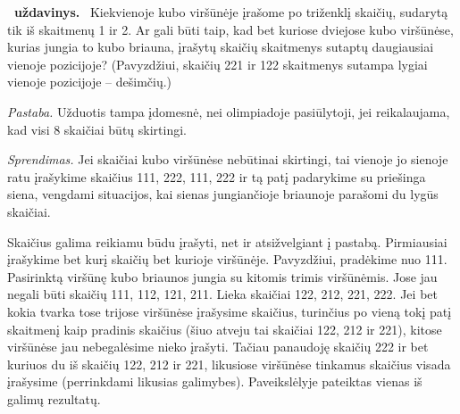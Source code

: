 \documentclass[11pt,a4paper]{article}
\newcounter{uzdavinys}
\newenvironment{uzdavinys}
  {\refstepcounter{uzdavinys}\par\medskip\noindent\textbf{\theuzdavinys\ uždavinys.}\ }
  {\par\medskip}
\begin{document}
\begin{uzdavinys} 
Kiekvienoje kubo viršūnėje įrašome po triženklį skaičių, sudarytą tik iš skaitmenų 1 ir 2. Ar gali būti taip, kad bet kuriose dviejose kubo viršūnėse, kurias jungia to kubo briauna, įrašytų skaičių skaitmenys sutaptų daugiausiai vienoje pozicijoje? (Pavyzdžiui, skaičių 221 ir 122 skaitmenys sutampa lygiai vienoje pozicijoje -- dešimčių.)

\textit{Pastaba.} Užduotis tampa įdomesnė, nei olimpiadoje pasiūlytoji, jei reikalaujama, kad visi 8 skaičiai būtų skirtingi.
\end{uzdavinys}

\textit{Sprendimas.} Jei skaičiai kubo viršūnėse nebūtinai skirtingi, tai vienoje jo sienoje ratu įrašykime skaičius 111, 222, 111, 222 ir tą patį padarykime su priešinga siena, vengdami situacijos, kai sienas jungiančioje briaunoje parašomi du lygūs skaičiai.

Skaičius galima reikiamu būdu įrašyti, net ir atsižvelgiant į pastabą. Pirmiausiai įrašykime bet kurį skaičių bet kurioje viršūnėje. Pavyzdžiui, pradėkime nuo 111. Pasirinktą viršūnę kubo briaunos jungia su kitomis trimis viršūnėmis. Jose jau negali būti skaičių 111, 112, 121, 211. Lieka skaičiai 122, 212, 221, 222. Jei bet kokia tvarka tose trijose viršūnėse įrašysime skaičius, turinčius po vieną tokį patį skaitmenį kaip pradinis skaičius (šiuo atveju tai skaičiai 122, 212 ir 221), kitose viršūnėse jau nebegalėsime nieko įrašyti. Tačiau panaudoję skaičių 222 ir bet kuriuos du iš skaičių 122, 212 ir 221, likusiose viršūnėse tinkamus skaičius visada įrašysime (perrinkdami likusias galimybes). Paveikslėlyje pateiktas vienas iš galimų rezultatų.

\begin{center}
\end{center}
\end{document}
